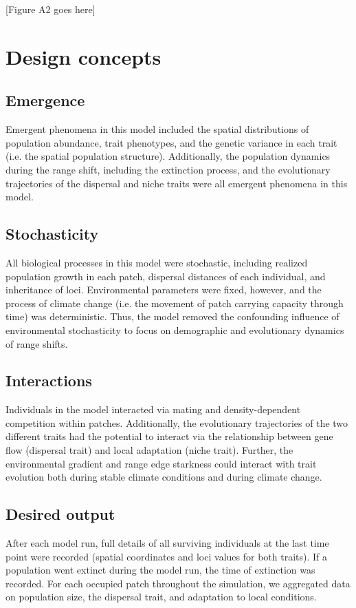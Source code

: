 \documentclass[11pt]{article}
\begin{document}
[Figure A2 goes here]

\section*{Design concepts}
\subsection*{Emergence} 
Emergent phenomena in this model included the spatial distributions of population abundance, trait phenotypes, and the genetic variance in each trait (i.e. the spatial population structure). Additionally, the population dynamics during the range shift, including the extinction process, and the evolutionary trajectories of the dispersal and niche traits were all emergent phenomena in this model.

\subsection*{Stochasticity} 
All biological processes in this model were stochastic, including realized population growth in each patch, dispersal distances of each individual, and inheritance of loci. Environmental parameters were fixed, however, and the process of climate change (i.e. the movement of patch carrying capacity through time) was deterministic. Thus, the model removed the confounding influence of environmental stochasticity to focus on demographic and evolutionary dynamics of range shifts.

\subsection*{Interactions} 
Individuals in the model interacted via mating and density-dependent competition within patches. Additionally, the evolutionary trajectories of the two different traits had the potential to interact via the relationship between gene flow (dispersal trait) and local adaptation (niche trait). Further, the environmental gradient and range edge starkness could interact with trait evolution both during stable climate conditions and during climate change.

\subsection*{Desired output} 
After each model run, full details of all surviving individuals at the last time point were recorded (spatial coordinates and loci values for both traits). If a population went extinct during the model run, the time of extinction was recorded. For each occupied patch throughout the simulation, we aggregated data on population size, the dispersal trait, and adaptation to local conditions. 
\end{document}
